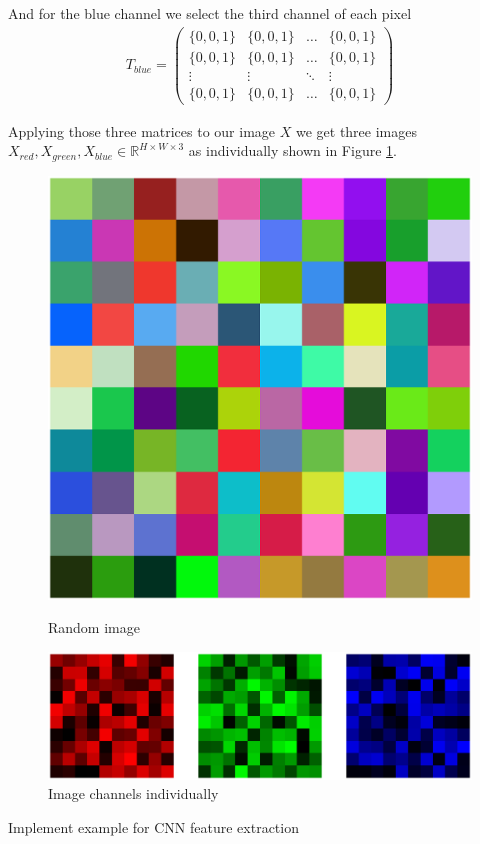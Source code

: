 And for the blue channel we select the third channel of each pixel
\begin{align}
  T_{blue} = \begin{pmatrix}
    \{0, 0, 1\}
    & \{0, 0, 1\}
    & \dots
    & \{0, 0, 1\}\\
    \{0, 0, 1\}
    & \{0, 0, 1\}
    & \dots
    & \{0, 0, 1\}\\
    \vdots & \vdots & \ddots & \vdots \\
    \{0, 0, 1\}
    & \{0, 0, 1\}
    & \dots
    & \{0, 0, 1\}
  \end{pmatrix}
\end{align}

Applying those three matrices to our image $X$ we get three images $X_{red}, X_{green}, X_{blue} \in \mathbb{R}^{H \times W \times 3}$ as individually shown in Figure \ref{fig:channels-individual}.
\begin{figure}
  \centering
\begin{minipage}[t]{.3\textwidth}
  \includegraphics[width=.95\textwidth]{images/FE_img_rng_image.eps}
  \caption{Random image}
  \label{fig:channels}
\end{minipage}
\begin{minipage}[t]{.6\textwidth}
  \includegraphics[width=.95\textwidth]{images/FE_img_channels.eps}
  \caption{Image channels individually}
  \label{fig:channels-individual}
\end{minipage}
\end{figure}

\framedtext{\color{red}{TODO:}} Implement example for CNN feature extraction

